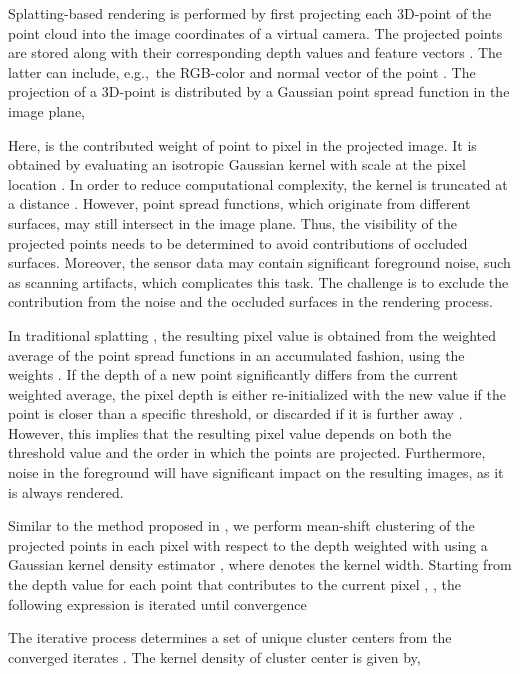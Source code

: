 \documentclass[runningheads,a4paper]{llncs}
\begin{document}
Splatting-based rendering is performed by first projecting each 3D-point  of the point cloud into the image coordinates  of a virtual camera. The projected points are stored along with their corresponding depth values  and feature vectors . The latter can include, e.g.,\ the RGB-color and normal vector of the point . The projection of a 3D-point is distributed by a Gaussian point spread function in the image plane,

Here,  is the contributed weight of point  to pixel  in the projected image. It is obtained by evaluating an isotropic Gaussian kernel  with scale  at the pixel location . In order to reduce computational complexity, the kernel is truncated at a distance . However, point spread functions, which originate from different surfaces, may still intersect in the image plane. Thus, the visibility of the projected points needs to be determined to avoid contributions of occluded surfaces.  Moreover, the sensor data may contain significant foreground noise, such as scanning artifacts, which complicates this task. The challenge is to exclude the contribution from the noise and the occluded surfaces in the rendering process. 





In traditional splatting \cite{zwicker2001surface}, the resulting pixel value is obtained from the weighted average of the point spread functions in an accumulated fashion, using the weights . If the depth of a new point significantly differs from the current weighted average, the pixel depth is either re-initialized with the new value if the point is closer than a specific threshold, or discarded if it is further away \cite{zwicker2001surface}. However, this implies that the resulting pixel value depends on both the threshold value and the order in which the points are projected. Furthermore, noise in the foreground will have significant impact on the resulting images, as it is always rendered.

Similar to the method proposed in \cite{ogniewski17}, we perform mean-shift clustering \cite{szeliski10} of the projected points in each pixel with respect to the depth  weighted with  using a Gaussian kernel density estimator , where  denotes the kernel width. Starting from the depth value  for each point  that contributes to the current pixel , , the following expression is iterated until convergence



The iterative process determines a set of unique cluster centers  from the converged iterates . The kernel density of cluster center  is given by,
\end{document}
